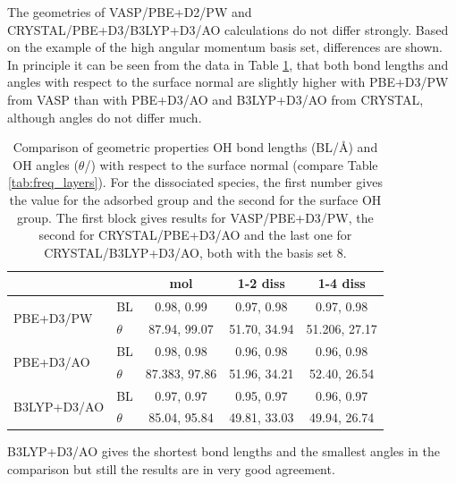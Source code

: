 \documentclass[11pt,DIV=13,BCOR=5mm,a4paper,headinclude]{scrbook}
\begin{document}
 
The geometries of VASP/PBE+D2/PW and CRYSTAL/PBE+D3/B3LYP+D3/AO calculations do not differ strongly.
Based on the example of the high angular momentum basis set, differences are shown.
In principle it can be seen from the data in Table \ref{tab:geom_comp_vasp-crystal}, that both bond lengths and angles with respect to the surface normal are slightly higher with PBE+D3/PW from VASP than with PBE+D3/AO and B3LYP+D3/AO from CRYSTAL, although angles do not differ much.
\begin{table}[!h]
  \centering
   \caption{Comparison of geometric properties OH bond lengths (BL/\AA{}) and OH angles ($\theta$/\textdegree) with respect to the surface normal (compare Table \ref{tab:freq_layers}).
For the dissociated species, the first number gives the value for the adsorbed group and the second for the surface OH group.
The first block gives results for VASP/PBE+D3/PW, the second for CRYSTAL/PBE+D3/AO and the last one for CRYSTAL/B3LYP+D3/AO, both with the basis set 8.}
  \begin{tabular}{ll|ccc}
  \toprule
   &&mol & 1-2 diss & 1-4 diss \\\midrule
\multirow{2}{*}{PBE+D3/PW} &BL &0.98, 0.99 &0.97, 0.98 &0.97, 0.98 \\
&$\theta$ &87.94, 99.07 &51.70, 34.94 &51.206, 27.17 \\\midrule
\multirow{2}{*}{PBE+D3/AO}&BL &0.98, 0.98 &0.96, 0.98 &0.96, 0.98 \\
&$\theta$ &87.383, 97.86 &51.96, 34.21 &52.40, 26.54 \\\midrule
\multirow{2}{*}{B3LYP+D3/AO}& BL &0.97, 0.97 &0.95, 0.97 &0.96, 0.97 \\
&$\theta$ &85.04, 95.84 &49.81, 33.03 &49.94, 26.74 \\\bottomrule
  \end{tabular}
  \label{tab:geom_comp_vasp-crystal}
\end{table}
B3LYP+D3/AO gives the shortest bond lengths and the smallest angles in the comparison but still the results are in very good agreement.
\end{document}
